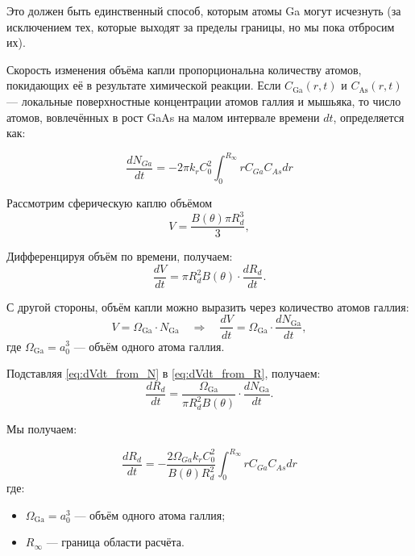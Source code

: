 \documentclass[14pt,oneside]{extarticle}
\begin{document}
Это должен быть единственный способ, которым атомы Ga могут исчезнуть (за исключением тех, которые выходят за пределы границы, но мы пока отбросим их). 

Скорость изменения объёма капли пропорциональна количеству атомов, покидающих её в результате химической реакции. Если \( C_{\text{Ga}}(r,t) \) и \( C_{\text{As}}(r,t) \) — локальные поверхностные концентрации атомов галлия и мышьяка, то число атомов, вовлечённых в рост GaAs на малом интервале времени \( dt \), определяется как:

\begin{equation}
\frac{dN_{Ga}}{dt}=-2\pi k_{r}C_{0}^{2}\int_{0}^{R_{\infty}}rC_{Ga}C_{As}dr
\end{equation}

Рассмотрим сферическую каплю объёмом
\begin{equation}
V = \frac{B(\theta)\pi R_d^3}{3},
\end{equation}

Дифференцируя объём по времени, получаем:
\begin{equation}
\frac{dV}{dt} = {\pi R_d^2B(\theta)} \cdot \frac{dR_d}{dt}.
\label{eq:dVdt_from_R}
\end{equation}

С другой стороны, объём капли можно выразить через количество атомов галлия:
\begin{equation}
V = \Omega_{\text{Ga}} \cdot N_{\text{Ga}} \quad \Rightarrow \quad \frac{dV}{dt} = \Omega_{\text{Ga}} \cdot \frac{dN_{\text{Ga}}}{dt},
\label{eq:dVdt_from_N}
\end{equation}
где $\Omega_{\text{Ga}} = a_0^3$ — объём одного атома галлия.

Подставляя \eqref{eq:dVdt_from_N} в \eqref{eq:dVdt_from_R}, получаем:
\begin{equation}
\frac{dR_d}{dt} = \frac{\Omega_{\text{Ga}} }{\pi R_d^2 B(\theta)} \cdot \frac{dN_{\text{Ga}}}{dt}.
\end{equation}

Мы получаем:

\begin{equation}
\frac{dR_{d}}{dt}=-\frac{2\Omega_{Ga}k_{r}C_{0}^{2}}{B\left(\theta\right)R_{d}^{2}}\int_{0}^{R_{\infty}}rC_{Ga}C_{As}dr
\label{eq:dRdt_integral}
\end{equation}
где:
\begin{itemize}
  \item \( \Omega_{\text{Ga}} = a_0^3 \) — объём одного атома галлия;
  \item \( R_\infty \) — граница области расчёта.
\end{itemize}
\end{document}
